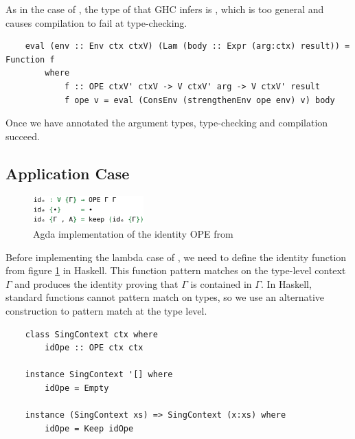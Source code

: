 As in the  case of , the type of  that GHC infers is , which is too general and causes compilation to fail at type-checking.

\begin{lstlisting}
    eval (env :: Env ctx ctxV) (Lam (body :: Expr (arg:ctx) result)) = Function f 
        where
            f :: OPE ctxV' ctxV -> V ctxV' arg -> V ctxV' result
            f ope v = eval (ConsEnv (strengthenEnv ope env) v) body
\end{lstlisting}

Once we have annotated the argument types, type-checking and compilation succeed.

\subsection{Application Case}

\begin{figure}[h]
    \centering
    \includegraphics[width=0.38\textwidth]{./images/agda_id_ope.png}
    \caption{Agda implementation of the identity OPE from \cite{AgdaNbe}}
    \label{fig:agdaIdOPE}
\end{figure}

Before implementing the lambda case of , we need to define the identity  function from figure \ref{fig:agdaIdOPE} in Haskell. This function pattern matches on the type-level context $\Gamma$ and produces the identity  proving that $\Gamma$ is contained in $\Gamma$. In Haskell, standard functions cannot pattern match on types, so we use an alternative construction to pattern match at the type level.



\begin{lstlisting}
    class SingContext ctx where
        idOpe :: OPE ctx ctx

    instance SingContext '[] where
        idOpe = Empty

    instance (SingContext xs) => SingContext (x:xs) where
        idOpe = Keep idOpe
\end{lstlisting}

